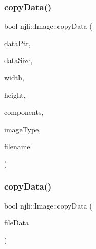 \subsubsection{\texorpdfstring{copy\+Data()}{copyData()}\hspace{0.1cm}{\footnotesize\ttfamily [1/2]}}
{\footnotesize\ttfamily bool njli\+::\+Image\+::copy\+Data (\begin{DoxyParamCaption}\item[{\mbox{\hyperlink{_thread_8h_af1e856da2e658414cb2456cb6f7ebc66}{void}} $\ast$}]{data\+Ptr,  }\item[{long}]{data\+Size,  }\item[{\mbox{\hyperlink{_util_8h_aa62c75d314a0d1f37f79c4b73b2292e2}{s32}}}]{width,  }\item[{\mbox{\hyperlink{_util_8h_aa62c75d314a0d1f37f79c4b73b2292e2}{s32}}}]{height,  }\item[{\mbox{\hyperlink{_util_8h_aa62c75d314a0d1f37f79c4b73b2292e2}{s32}}}]{components,  }\item[{\mbox{\hyperlink{namespacenjli_a709a24b63b768ce1cdff54f7f48d3c0b}{njli\+Image\+Type}}}]{image\+Type,  }\item[{const std\+::string \&}]{filename }\end{DoxyParamCaption})\hspace{0.3cm}{\ttfamily [protected]}}

\mbox{\label{classnjli_1_1_image_a2c286ee7b39964ce40a14fab298e707a}} 
\subsubsection{\texorpdfstring{copy\+Data()}{copyData()}\hspace{0.1cm}{\footnotesize\ttfamily [2/2]}}
{\footnotesize\ttfamily bool njli\+::\+Image\+::copy\+Data (\begin{DoxyParamCaption}\item[{const \mbox{\hyperlink{structnjli_1_1_world_resource_loader_1_1_image_file_data}{World\+Resource\+Loader\+::\+Image\+File\+Data}} $\ast$}]{file\+Data }\end{DoxyParamCaption})\hspace{0.3cm}{\ttfamily [protected]}}

\mbox{\label{classnjli_1_1_image_a83a8876ae63b92804004cf3febe76573}} 
